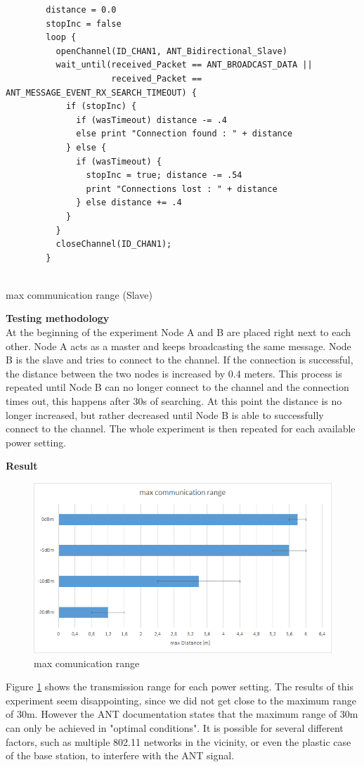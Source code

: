 \begin{description}
	\begin{code}[H]
		\begin{verbatim}
		distance = 0.0
		stopInc = false
		loop {
		  openChannel(ID_CHAN1, ANT_Bidirectional_Slave)
		  wait_until(received_Packet == ANT_BROADCAST_DATA || 
		             received_Packet == ANT_MESSAGE_EVENT_RX_SEARCH_TIMEOUT) {
		    if (stopInc) { 
		      if (wasTimeout) distance -= .4
		      else print "Connection found : " + distance
		    } else {
		      if (wasTimeout) { 
		        stopInc = true; distance -= .54
		        print "Connections lost : " + distance
		      } else distance += .4
		    }
		  }
		  closeChannel(ID_CHAN1);		
		}
		
		\end{verbatim}
		\caption{max communication range (Slave)}\label{lst:sExp6}
	\end{code}
	\item{\textbf{Testing methodology}} \hfill \\ At the beginning of the experiment Node A and B are placed right next to each other. Node A acts as a master and keeps broadcasting the same message. Node B is the slave and tries to connect to the channel. If the connection is successful, the distance between the two nodes is increased by 0.4 meters. This process is repeated until Node B can no longer connect to the channel and the connection times out, this happens after 30s of searching. At this point the distance is no longer increased, but rather decreased until Node B is able to successfully connect to the channel. The whole experiment is then repeated for each available power setting.	
	\item{\textbf{Result}} \hfill \\ 
	\begin{figure}[H]
		\centering
		\includegraphics[scale=0.5]{./pics/exp6.png}
		\caption{max comunication range}\label{fig:exp6}
	\end{figure}
	Figure \ref{fig:exp6} shows the transmission range for each power setting. The results of this experiment seem disappointing, since we did not get close to the maximum range of 30m. However the ANT documentation states that the maximum range of 30m can only be achieved in "optimal conditions". It is possible for several different factors, such as multiple 802.11 networks in the vicinity, or even the plastic case of the base station, to interfere with the ANT signal. 
\end{description}
\newpage


